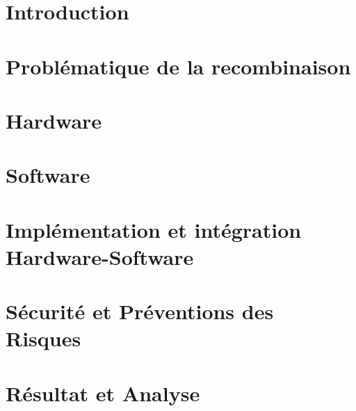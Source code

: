 \documentclass[
    iai, %
    eai, %
]{heig-tb}
\begin{document}
\maketitle
\frontmatter
\clearemptydoublepage

\preamble
\authentification

\begin{abstract}
    
\end{abstract}

\clearemptydoublepage
{
    \tableofcontents
    \let\cleardoublepage\clearpage
    \listoffigures
    \let\cleardoublepage\clearpage
    \listoftables
    \let\cleardoublepage\clearpage
    \listoflistings
    }
    
\printnomenclature
\clearemptydoublepage
{}

\mainmatter
\chapter{Introduction}


\chapter{Problématique de la recombinaison}

\chapter{Hardware}

\chapter{Software}



\chapter{Implémentation et intégration Hardware-Software}


\chapter{Sécurité et Préventions des Risques}

\chapter{Résultat et Analyse}

\end{document}
